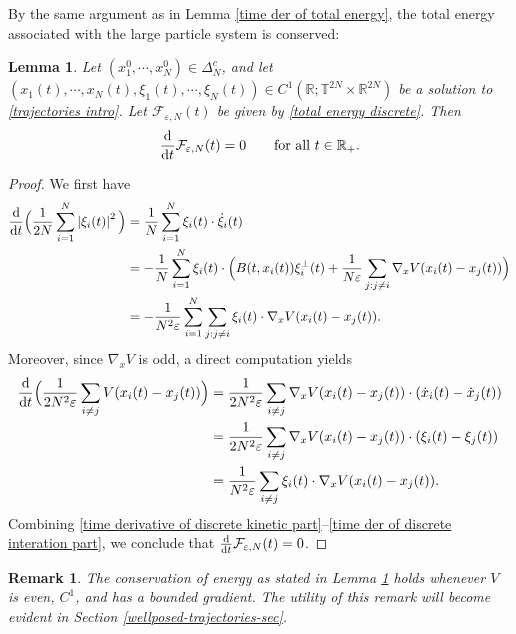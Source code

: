 \documentclass[11pt,reqno]{amsart}
\newtheorem{lem}[thm]{Lemma}
\newtheorem{rem}[thm]{Remark}
\numberwithin{equation}{section}
\def\dd{{\rm d}}
\begin{document}
By the same argument as in Lemma \ref{time der of total energy}, the total energy associated with the large particle system is conserved:
 \begin{lem} \label{Conservation of discrete energy}
Let $(x_{1}^{0},\cdots\!,x_{N}^{0})\in \Delta_{N}^{c}$, 
and let $(x_{1}(t),\cdots\!,x_{N}(t),\xi_{1}(t),\cdots\!,\xi_{N}(t))\in C^{1}(\mathbb{R};\mathbb{T}^{2N}\times \mathbb{R}^{2N})$ 
be a solution to \eqref{trajectories intro}. Let $\mathcal{F}_{\varepsilon,N}(t)$ be given by \eqref{total energy discrete}. Then
\begin{align*}
\frac{\dd}{\dd t}\mathcal{F}_{\varepsilon,N}(t)=0 \qquad \mbox{for all}\ t\in \mathbb{R}_{+}.     
\end{align*}
\end{lem}
\begin{proof}
We first have 
\begin{align}
\frac{\dd}{\dd t}\Big(\frac{1}{2N}\sum_{i=1}^{N}\left\vert \xi_{i}(t)\right\vert^{2} \Big)
&=\frac{1}{N}\sum_{i=1}^{N}\xi_{i}(t)\cdot \dot \xi_{i}(t) \notag\\
&=-\frac{1}{N}\sum_{i=1}^{N}\xi_{i}(t)\cdot\Big(B(t,x_{i}(t))\xi_{i}^{\perp}(t)+\frac{1}{N\varepsilon}\sum_{j:j\neq i}\nabla_{x} V(x_{i}(t)-x_{j}(t))\Big) \notag\\
&=-\frac{1}{N^{2}\varepsilon}\sum_{i=1}^{N}\sum_{j:j\neq i}\xi_{i}(t)\cdot \nabla_{x} V(x_{i}(t)-x_{j}(t)). \label{time derivative of discrete kinetic part}     
\end{align}
Moreover, since \(\nabla_x V\) is odd, a direct computation yields
\begin{align}
\frac{\dd}{\dd t}\Big(\frac{1}{2N^{2}\varepsilon}\sum_{i\neq j}V(x_{i}(t)-x_{j}(t))\Big)
&=\frac{1}{2N^{2}\varepsilon}\sum_{i\neq j}\nabla_{x} V(x_{i}(t)-x_{j}(t))\cdot(\dot x_{i}(t)-\dot x_{j}(t)) \notag\\
&=\frac{1}{2N^{2}\varepsilon}\sum_{i\neq j} \nabla_{x} V(x_{i}(t)-x_{j}(t))\cdot(\xi_{i}(t)-\xi_{j}(t)) \notag\\
&=\frac{1}{N^{2}\varepsilon}\sum_{i\neq j}\xi_{i}(t)\cdot\nabla_{x} V(x_{i}(t)-x_{j}(t)). \label{time der of discrete interation part}  
\end{align}
Combining \eqref{time derivative of discrete kinetic part}--\eqref{time der of discrete interation part},
we conclude that $\frac{\dd}{\dd t}\mathcal{F}_{\varepsilon,N}(t)=0$. 
\end{proof}

\begin{rem}
The conservation of energy as stated in {\rm Lemma \ref{Conservation of discrete energy}} holds whenever $V$ is even, $C^1$, and has a bounded gradient. The utility of this remark will become evident in {\rm Section \ref{wellposed-trajectories-sec}}.   \label{rem about conse of energy}  
\end{rem}
\end{document}
